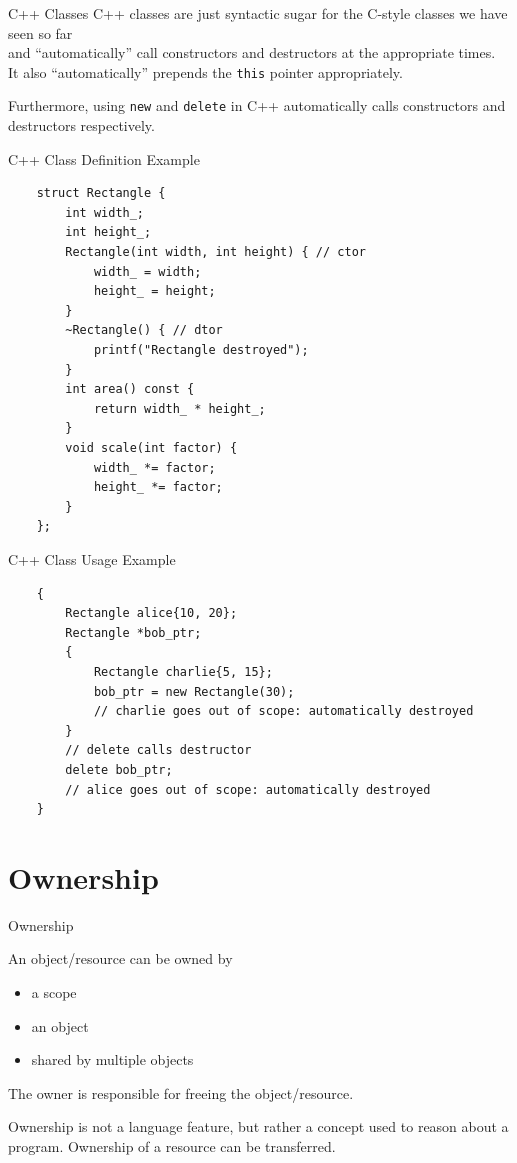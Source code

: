 \begin{frame}[fragile]{C++ Classes}
  C++ classes are just syntactic sugar for the C-style classes we have seen so far\\
  and ``automatically'' call constructors and destructors at the appropriate times.\\
  It also ``automatically'' prepends the \verb|this| pointer appropriately.
  \vspace{0.5cm}

  Furthermore, using \verb|new| and \verb|delete| in C++ automatically calls constructors and destructors respectively.
\end{frame}

\begin{frame}[fragile]{C++ Class Definition Example}
  \begin{verbatim}
    struct Rectangle {
        int width_;
        int height_;
        Rectangle(int width, int height) { // ctor
            width_ = width;
            height_ = height;
        }
        ~Rectangle() { // dtor
            printf("Rectangle destroyed");
        }
        int area() const {
            return width_ * height_;
        }
        void scale(int factor) {
            width_ *= factor;
            height_ *= factor;
        }
    };
  \end{verbatim}
\end{frame}

\begin{frame}[fragile]{C++ Class Usage Example}
  \begin{verbatim}
    {
        Rectangle alice{10, 20};
        Rectangle *bob_ptr;
        {
            Rectangle charlie{5, 15};
            bob_ptr = new Rectangle(30);
            // charlie goes out of scope: automatically destroyed
        }
        // delete calls destructor
        delete bob_ptr;
        // alice goes out of scope: automatically destroyed
    }
  \end{verbatim}
\end{frame}

\section{Ownership}

\begin{frame}[fragile]{Ownership}
  \begin{sqt:definition}
    An object/resource can be owned by 
    \begin{itemize}
      \item a scope
      \item an object
      \item shared by multiple objects
    \end{itemize}
    The owner is responsible for freeing the object/resource.
  \end{sqt:definition}

  Ownership is not a language feature, but rather a concept used to reason about a program.
  Ownership of a resource can be transferred.
\end{frame}

